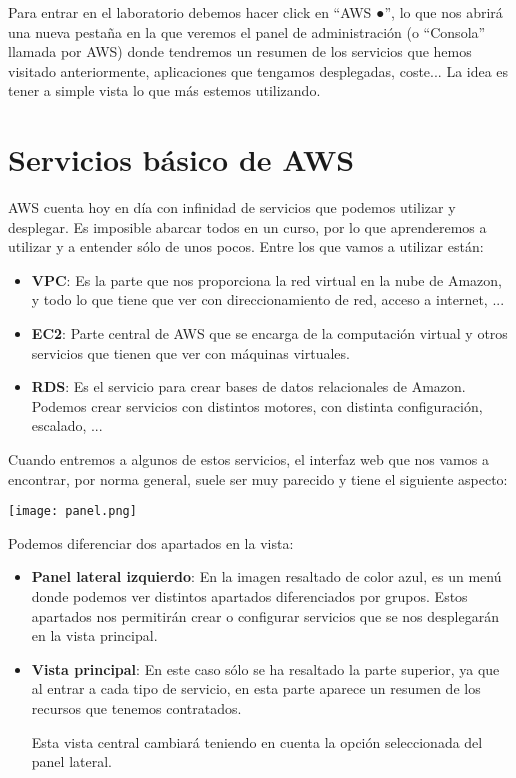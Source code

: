 Para entrar en el laboratorio debemos hacer click en “{AWS \color{green}●}”, lo que nos abrirá una nueva pestaña en la que veremos el panel de administración (o “Consola” llamada por AWS) donde tendremos un resumen de los servicios que hemos visitado anteriormente, aplicaciones que tengamos desplegadas, coste... La idea es tener a simple vista lo que más estemos utilizando.


\chapter{Servicios básico de AWS}

AWS cuenta hoy en día con infinidad de servicios que podemos utilizar y desplegar. Es imposible abarcar todos en un curso, por lo que aprenderemos a utilizar y a entender sólo de unos pocos. Entre los que vamos a utilizar están:

\begin{itemize}
	\item \textbf{VPC}: Es la parte que nos proporciona la red virtual en la nube de Amazon, y todo lo que tiene que ver con direccionamiento de red, acceso a internet, ... 
	\item \textbf{EC2}: Parte central de AWS que se encarga de la computación virtual y otros servicios que tienen que ver con máquinas virtuales.
	\item \textbf{RDS}: Es el servicio para crear bases de datos relacionales de Amazon. Podemos crear servicios con distintos motores, con distinta configuración, escalado, ...
\end{itemize}

Cuando entremos a algunos de estos servicios, el interfaz web que nos vamos a encontrar, por norma general, suele ser muy parecido y tiene el siguiente aspecto:

\begin{center}
	\texttt{[image: panel.png]}
\end{center}

Podemos diferenciar dos apartados en la vista:
\begin{itemize}
	\item \textbf{Panel lateral izquierdo}: En la imagen resaltado de color azul, es un menú donde podemos ver distintos apartados diferenciados por grupos. Estos apartados nos permitirán crear o configurar servicios que se nos desplegarán en la vista principal.
	
	\item \textbf{Vista principal}: En este caso sólo se ha resaltado la parte superior, ya que al entrar a cada tipo de servicio, en esta parte aparece un resumen de los recursos que tenemos contratados.
	
	Esta vista central cambiará teniendo en cuenta la opción seleccionada del panel lateral.
\end{itemize}

